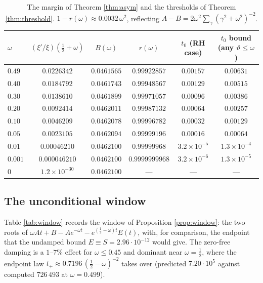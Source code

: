 \documentclass[11pt,reqno]{amsart}
\theoremstyle{plain}
\theoremstyle{definition}
\begin{document}
\begin{table}[htbp]
\centering
\begin{tabular}{@{}lccccc@{}}
\toprule
$\omega$ & $(\xi'/\xi)(\tfrac12+\omega)$ & $B(\omega)$ & $r(\omega)$ & $t_0$ (RH case) & $t_0$ bound (any $\vartheta\le\omega$)\\
\midrule
$0.49$  & $0.0226342$   & $0.0461565$ & $0.99922857$ & $0.00157$   & $0.00631$\\
$0.40$  & $0.0184792$   & $0.0461743$ & $0.99948567$ & $0.00129$   & $0.00515$\\
$0.30$  & $0.0138610$   & $0.0461899$ & $0.99971057$ & $0.00096$   & $0.00386$\\
$0.20$  & $0.0092414$   & $0.0462011$ & $0.99987132$ & $0.00064$   & $0.00257$\\
$0.10$  & $0.0046209$   & $0.0462078$ & $0.99996782$ & $0.00032$   & $0.00129$\\
$0.05$  & $0.0023105$   & $0.0462094$ & $0.99999196$ & $0.00016$   & $0.00064$\\
$0.01$  & $0.00046210$  & $0.0462100$ & $0.99999968$ & $3.2\times10^{-5}$ & $1.3\times10^{-4}$\\
$0.001$ & $0.000046210$ & $0.0462100$ & $0.9999999968$ & $3.2\times10^{-6}$ & $1.3\times10^{-5}$\\
$0$     & $1.2\times10^{-30}$ & $0.0462100$ & --- & --- & ---\\
\bottomrule
\end{tabular}
\vspace{2mm}
\caption{The margin of Theorem \ref{thm:asym} and the thresholds of Theorem \ref{thm:threshold}.
$1-r(\omega)\approx0.0032\,\omega^{2}$, reflecting
$A-B=2\omega^{2}\sum_\gamma(\gamma^{2}+\omega^{2})^{-2}$.}
\label{tab:margin}
\end{table}

\subsection{The unconditional window}
Table \ref{tab:window} records the window of Proposition \ref{prop:window}: the two roots of
$\omega A t+B-Ae^{-\omega t}-e^{(\frac12-\omega)t}E(t)$, with, for comparison, the endpoint that
the undamped bound $E\equiv S=2.96\cdot10^{-12}$ would give. The zero-free damping is a
$1$--$7\%$ effect for $\omega\le0.45$ and dominant near $\omega=\tfrac12$, where the endpoint law
$t_{+}\approx0.7196\,(\tfrac12-\omega)^{-2}$ takes over (predicted $7.20\cdot10^{5}$ against
computed $726\,493$ at $\omega=0.499$).
\end{document}
